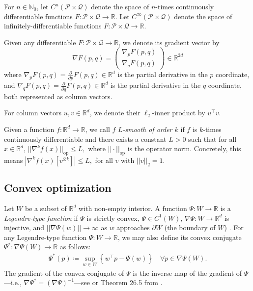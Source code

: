 \documentclass[11pt]{article}
\renewcommand{\P}{\mathcal{P}}
\newcommand{\R}{\mathbb{R}}
\newcommand{\N}{\mathbb{N}}
\newcommand{\Q}{\mathcal{Q}}
\newcommand{\lnorm}{\left|\left|}
\newcommand{\rnorm}{\right|\right|}
\begin{document}
For $n \in \N_0$, let $C^n(\P \times \Q)$ denote the space of $n$-times continuously differentiable functions $F \colon \P \times \Q \to \R$.
Let $C^\infty(\P \times \Q)$ denote the space of infinitely-differentiable functions $F \colon \P \times \Q \to \R$.

Given any differentiable $F:\P \times \Q\rightarrow\R$, we denote its gradient vector by
$$\nabla F(p,q) = \begin{pmatrix}
    \nabla_p F(p,q) \\
    \nabla_q F(p,q)
\end{pmatrix} \in \R^{2d}$$
where $\nabla_p F(p,q) = \frac{\partial}{\partial p} F(p,q) \in \R^d$ is the partial derivative in the $p$ coordinate, and $\nabla_q F(p,q) = \frac{\partial}{\partial q} F(p,q) \in \R^d$ is the partial derivative in the $q$ coordinate, both represented as column vectors.

For column vectors $u,v \in \R^d$, we denote their $\ell_2$-inner product by $u^\top v$.

Given a function  $f: \mathbb{R}^d \to \mathbb{R}$, we call $f$ \textit{$L$-smooth of order $k$} if $f$ is $k$-times continuously differentiable and there exists a constant $L>0$ such that for all $x\in \mathbb{R}^d$,
$
||\nabla^k f(x)||_{\textrm{op}} \leq L,
$
where $||\cdot||_{\textrm{op}}$ is the operator norm. Concretely, this means
$
|\nabla^k f(x)[v^{\otimes k}]| \leq L,
$
for all $v$ with $||v||_2 = 1$.

\subsection{Convex optimization}
Let $W$ be a subset of $\R^{d}$ with non-empty interior. A function $\Psi:W\rightarrow\R$ is a \textit{Legendre-type function} if $\Psi$ is strictly convex, $\Psi\in C^{1}\left(W\right)$, $\nabla \Psi:W\rightarrow\R^{d}$ is injective, and $\lnorm\nabla\Psi\left(w\right)\rnorm\rightarrow\infty$ as $w$ approaches $\partial W$ (the boundary of $W$) \citep[Section 26]{Rockafellar1996}. For any Legendre-type function $\Psi:W\rightarrow\R$, we may also define its convex conjugate $\Psi^{*}:\nabla\Psi\left(W\right)\rightarrow\R$ as follows:
\begin{gather}
    \Psi^{*}\left(p\right)\coloneqq \sup_{w\in W}\left\{w^{\top}p-\Psi\left(w\right)\right\}\quad \forall p\in\nabla\Psi\left(W\right).\nonumber
\end{gather}
The gradient of the convex conjugate of $\Psi$ is the inverse map of the gradient of $\Psi$---i.e., $\nabla\Psi^{*}=\left(\nabla\Psi\right)^{-1}$---see \cite{Ghaoui} or Theorem 26.5 from \cite{Rockafellar1996}.
\end{document}
